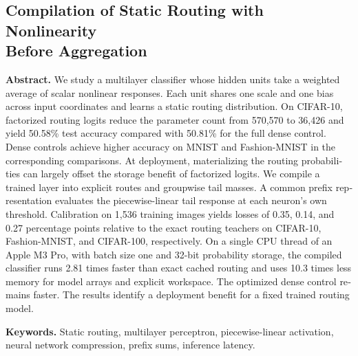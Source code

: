 \documentclass[11pt,a4paper]{article}
\begin{document}
\begin{english}
\section*{Compilation of Static Routing with Nonlinearity\\Before Aggregation}
\textbf{Abstract.}
We study a multilayer classifier whose hidden units take a weighted average of scalar nonlinear responses. Each unit shares one scale and one bias across input coordinates and learns a static routing distribution. On CIFAR-10, factorized routing logits reduce the parameter count from 570,570 to 36,426 and yield 50.58\% test accuracy compared with 50.81\% for the full dense control. Dense controls achieve higher accuracy on MNIST and Fashion-MNIST in the corresponding comparisons. At deployment, materializing the routing probabilities can largely offset the storage benefit of factorized logits. We compile a trained layer into explicit routes and groupwise tail masses. A common prefix representation evaluates the piecewise-linear tail response at each neuron's own threshold. Calibration on 1,536 training images yields losses of 0.35, 0.14, and 0.27 percentage points relative to the exact routing teachers on CIFAR-10, Fashion-MNIST, and CIFAR-100, respectively. On a single CPU thread of an Apple M3 Pro, with batch size one and 32-bit probability storage, the compiled classifier runs 2.81 times faster than exact cached routing and uses 10.3 times less memory for model arrays and explicit workspace. The optimized dense control remains faster. The results identify a deployment benefit for a fixed trained routing model.
\par\smallskip
\noindent\textbf{Keywords.} Static routing, multilayer perceptron, piecewise-linear activation, neural network compression, prefix sums, inference latency.
\end{english}
\end{document}
